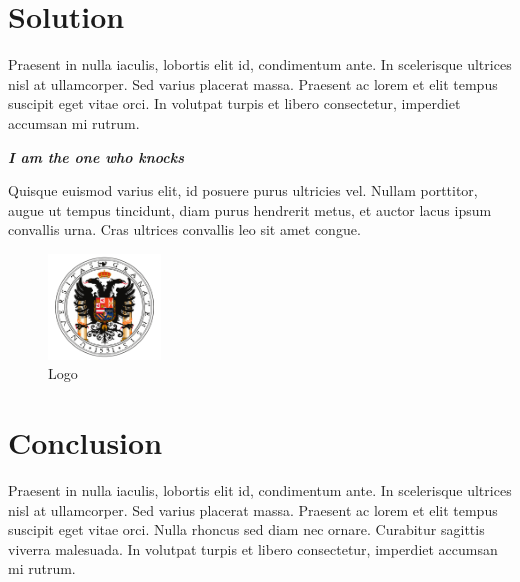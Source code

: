 \section{Solution}

Praesent in nulla iaculis, lobortis elit id, condimentum
ante. In scelerisque ultrices nisl at ullamcorper. Sed varius placerat massa.
Praesent ac lorem et elit tempus suscipit eget vitae orci. In volutpat turpis et
libero consectetur, imperdiet accumsan mi rutrum.

\begin{center}
    \textbf{\emph{I am the one who knocks}}
\end{center}

Quisque euismod varius elit, id posuere purus ultricies vel. Nullam porttitor,
augue ut tempus tincidunt, diam purus hendrerit metus, et auctor lacus ipsum
convallis urna. Cras ultrices convallis leo sit amet congue.

\begin{figure}[H]
    \centering
    \includegraphics[width=3cm]{figures/logos/logo_ugr.png}
    \caption{Logo}
    \label{logo}
\end{figure}

\section{Conclusion}
Praesent in nulla iaculis, lobortis elit id, condimentum
ante. In scelerisque ultrices nisl at ullamcorper. Sed varius placerat massa.
Praesent ac lorem et elit tempus suscipit eget vitae orci. Nulla rhoncus sed
diam nec ornare. Curabitur sagittis viverra malesuada. In volutpat turpis et
libero consectetur, imperdiet accumsan mi rutrum.
